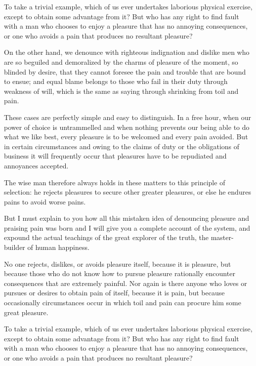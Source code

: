 To take a trivial example, which of us ever undertakes laborious physical exercise, except to obtain some advantage from it? But who has any right to find fault with a man who chooses to enjoy a pleasure that has no annoying consequences, or one who avoids a pain that produces no resultant pleasure?

On the other hand, we denounce with righteous indignation and dislike men who are so beguiled and demoralized by the charms of pleasure of the moment, so blinded by desire, that they cannot foresee the pain and trouble that are bound to ensue; and equal blame belongs to those who fail in their duty through weakness of will, which is the same as saying through shrinking from toil and pain.

These cases are perfectly simple and easy to distinguish. In a free hour, when our power of choice is untrammelled and when nothing prevents our being able to do what we like best, every pleasure is to be welcomed and every pain avoided. But in certain circumstances and owing to the claims of duty or the obligations of business it will frequently occur that pleasures have to be repudiated and annoyances accepted. 

The wise man therefore always holds in these matters to this principle of selection: he rejects pleasures to secure other greater pleasures, or else he endures pains to avoid worse pains.
\vfill
\stopcanonpage

\vfil\eject



\startcanonpage{27pc}
\typosize[12/14]
\noindent But I must explain to you how all this mistaken idea of denouncing pleasure and praising pain was born and I will give you a complete account of the system, and expound the actual teachings of the great explorer of the truth, the master-builder of human happiness. 

No one rejects, dislikes, or avoids pleasure itself, because it is pleasure, but because those who do not know how to pursue pleasure rationally encounter consequences that are extremely painful. Nor again is there anyone who loves or pursues or desires to obtain pain of itself, because it is pain, but because occasionally circumstances occur in which toil and pain can procure him some great pleasure. 

To take a trivial example, which of us ever undertakes laborious physical exercise, except to obtain some advantage from it? But who has any right to find fault with a man who chooses to enjoy a pleasure that has no annoying consequences, or one who avoids a pain that produces no resultant pleasure?

